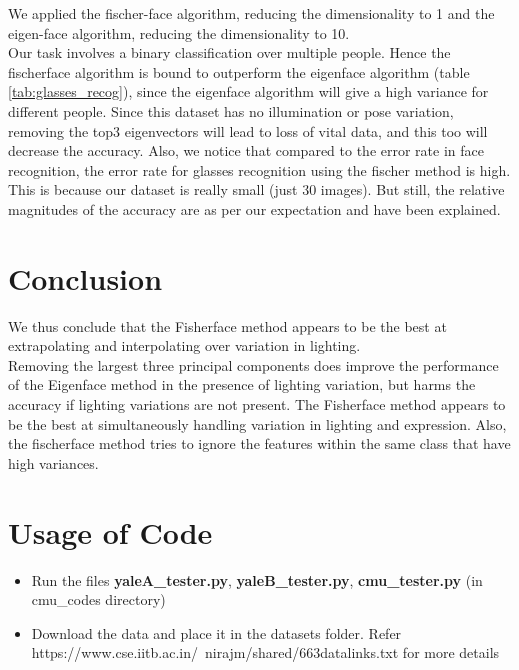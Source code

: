 \documentclass[12pt, a4paper]{article}
\begin{document}
We applied the fischer-face algorithm, reducing the dimensionality to 1 and the eigen-face algorithm, reducing the dimensionality to 10. \\ 
Our task involves a binary classification over multiple people. Hence the fischerface algorithm is bound to outperform the eigenface algorithm (table \ref{tab:glasses_recog}), since the eigenface algorithm will give a high variance for different people. Since this dataset has no illumination or pose variation, removing the top3 eigenvectors will lead to loss of vital data, and this too will decrease the accuracy. Also, we notice that compared to the error rate in face recognition, the error rate for glasses recognition using the fischer method is high. This is because our dataset is really small (just 30 images). But still, the relative magnitudes of the accuracy are as per our expectation and have been explained.
\newpage
\section{Conclusion}
We thus conclude that the Fisherface method appears to be the best at extrapolating and interpolating over variation in lighting. \\ Removing the largest three principal components does improve the performance of the Eigenface method in the presence of lighting variation, but harms the accuracy if lighting variations are not present. The Fisherface method appears to be the best at simultaneously handling variation in lighting and expression. Also, the fischerface method tries to ignore the features within the same class that have high variances.
\section{Usage of Code}
\begin{itemize}
    \item Run the files \textbf{yaleA\_tester.py}, \textbf{yaleB\_tester.py}, \textbf{cmu\_tester.py} (in cmu\_codes directory)
    \item Download the data and place it in the datasets folder. Refer https://www.cse.iitb.ac.in/~nirajm/shared/663datalinks.txt for more details
\end{itemize}
\newpage
\printbibliography
\end{document}
